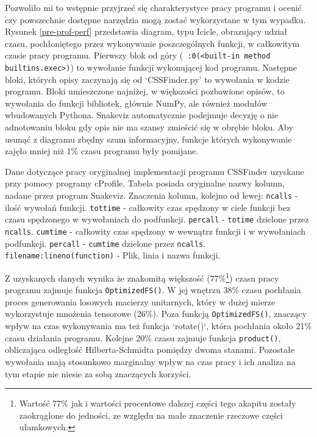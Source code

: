 \documentclass[11pt, a4paper]{article}
\newcommand{\code}[1]{\texttt{#1}}
\begin{document}
\begin{sloppypar}
    Pozwoliło mi to wstępnie przyjrzeć się charakterystyce pracy programu i ocenić czy powszechnie
    dostępne narzędzia mogą zostać wykorzystane w tym wypadku. Rysunek
    \ref{pre-prof-perf} przedstawia diagram, typu Icicle, obrazujący udział czasu, pochłoniętego
    przez wykonywanie poszczególnych funkcji, w całkowitym czasie pracy programu. Pierwszy
    blok od góry (\code{~:0(<built-in method builtins.exec>)}) to wywołanie funkcji
    wykonującej kod programu. Następne bloki, których opisy zaczynają się od `CSSFinder.py'
    to wywołania w kodzie programu. Bloki umieszczone najniżej, w większości pozbawione
    opisów, to wywołania do funkcji bibliotek, głównie NumPy, ale również modułów wbudowanych
    Pythona. Snakeviz automatycznie podejmuje decyzję o nie adnotowaniu bloku gdy opis
    nie ma szansy zmieścić się w obrębie bloku. Aby usunąć z diagramu zbędny szum informacyjny,
    funkcje których wykonywanie zajęło mniej niż 1\% czasu programu były pomijane.

    \FloatBarrier
    \begin{table}[ht]
      \tiny
      \centering
      
      \caption{Dane dotyczące pracy oryginalnej implementacji programu CSSFinder uzyskane przy pomocy programy cProfile. Tabela posiada oryginalne nazwy kolumn, nadane przez program Snakeviz. Znaczenia kolumn, kolejno od lewej: \code{ncalls} - ilość wywołań funkcji. \code{tottime} - całkowity czas spędzony w ciele funkcji bez czasu spędzonego w wywołaniach do podfunkcji. \code{percall} - \code{totime} dzielone przez \code{ncalls}. \code{cumtime} - całkowity czas spędzony w wewnątrz funkcji i w wywołaniach podfunkcji. \code{percall} - \code{cumtime} dzielone przez \code{ncalls}. \code{filename:lineno(function)} - Plik, linia i nazwa funkcji.}
    \end{table}
    \FloatBarrier

    Z uzyskanych danych wynika że znakomitą większość (77\%\footnote{Wartość 77\% jak i
    wartości procentowe dalszej części tego akapitu zostały zaokrąglone do jedności, ze względu
    na małe znaczenie rzeczowe części ułamkowych.}) czasu pracy programu zajmuje funkcja
    \code{OptimizedFS()}. W jej wnętrzu 38\% czasu pochłania proces generowania losowych
    macierzy unitarnych, który w dużej mierze wykorzystuje mnożenia tensorowe (26\%).
    Poza funkcją \code{OptimizedFS()}, znaczący wpływ na czas wykonywania ma też funkcja
    `rotate()`, która pochłania około 21\% czasu działania programu. Kolejne 20\% czasu
    zajmuje funkcja \code{product()}, obliczająca odległość Hilberta-Schmidta pomiędzy
    dwoma stanami. Pozostałe wywołania mają stosunkowo marginalny wpływ na czas pracy i ich
    analiza na tym etapie nie niesie za sobą znaczących korzyści.


\end{sloppypar}
\end{document}
